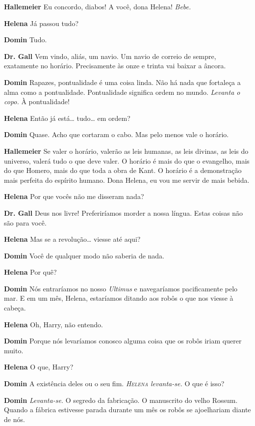 \textbf{Hallemeier} Eu concordo, diabos! A você, dona Helena! \emph{Bebe.}

\textbf{Helena} Já passou tudo?

\textbf{Domin} Tudo.

\textbf{Dr. Gall} Vem vindo, aliás, um navio. Um navio de correio de sempre, exatamente
no horário. Precisamente às onze e trinta vai baixar a âncora.

\textbf{Domin} Rapazes, pontualidade é uma coisa linda. Não há nada que fortaleça a alma
como a pontualidade. Pontualidade significa ordem no mundo. \emph{Levanta o copo.} À
pontualidade!

\textbf{Helena} Então já está\ldots{} tudo\ldots{} em ordem?

\textbf{Domin} Quase. Acho que cortaram o cabo. Mas pelo menos vale o horário.

\textbf{Hallemeier} Se valer o horário, valerão as leis humanas, as leis divinas, as
leis do universo, valerá tudo o que deve valer. O horário é mais do que o
evangelho, mais do que Homero, mais do que toda a obra de Kant. O horário é a
demonstração mais perfeita do espírito humano. Dona Helena, eu vou me servir de
mais bebida.

\textbf{Helena} Por que vocês não me disseram nada?

\textbf{Dr. Gall} Deus nos livre! Preferiríamos morder a nossa língua. Estas coisas não
são para você.

\textbf{Helena} Mas se a revolução\ldots{} viesse até aqui?

\textbf{Domin} Você de qualquer modo não saberia de nada.

\textbf{Helena} Por quê?

\textbf{Domin} Nós entraríamos no nosso \textit{Ultimus} e navegaríamos pacificamente pelo mar. E
em um mês, Helena, estaríamos ditando aos robôs o que nos viesse à cabeça.

\textbf{Helena} Oh, Harry, não entendo.

\textbf{Domin} Porque nós levaríamos conosco alguma coisa que os robôs iriam querer
muito.

\textbf{Helena} O que, Harry?

\textbf{Domin} A existência deles ou o seu fim. \emph{\textsc{Helena} levanta-se.} O que é
isso?

\textbf{Domin} \emph{Levanta-se.} O segredo da fabricação. O manuscrito do velho
Rossum. Quando a fábrica estivesse parada durante um mês os robôs se ajoelhariam
diante de nós.

